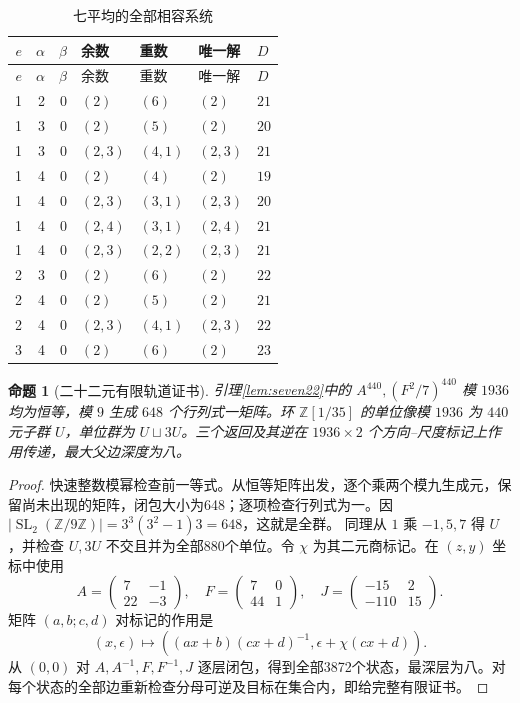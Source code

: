 \documentclass[11pt,a4paper]{article}
\newcommand{\Z}{\mathbb Z}
\newcommand{\SL}{\operatorname{SL}}
\newtheorem{proposition}[theorem]{命题}
\theoremstyle{definition}
\numberwithin{equation}{section}
\begin{document}
\begin{longtable}{rrrllll}
\caption{七平均的全部相容系统}\label{tab:seven-data}\\
\toprule $e$&$\alpha$&$\beta$&余数&重数&唯一解&$D$\\\midrule\endfirsthead
\toprule $e$&$\alpha$&$\beta$&余数&重数&唯一解&$D$\\\midrule\endhead
1&2&0&$(2)$&$(6)$&$(2)$&$21$\\
1&3&0&$(2)$&$(5)$&$(2)$&$20$\\
1&3&0&$(2,3)$&$(4,1)$&$(2,3)$&$21$\\
1&4&0&$(2)$&$(4)$&$(2)$&$19$\\
1&4&0&$(2,3)$&$(3,1)$&$(2,3)$&$20$\\
1&4&0&$(2,4)$&$(3,1)$&$(2,4)$&$21$\\
1&4&0&$(2,3)$&$(2,2)$&$(2,3)$&$21$\\
2&3&0&$(2)$&$(6)$&$(2)$&$22$\\
2&4&0&$(2)$&$(5)$&$(2)$&$21$\\
2&4&0&$(2,3)$&$(4,1)$&$(2,3)$&$22$\\
3&4&0&$(2)$&$(6)$&$(2)$&$23$\\
\bottomrule\end{longtable}\endgroup

\begin{proposition}[二十二元有限轨道证书]\label{prop:seven-certificate}
引理\ref{lem:seven22}中的 $A^{440},(F^2/7)^{440}$ 模 $1936$ 均为恒等，模 $9$ 生成 $648$ 个行列式一矩阵。环 $\Z[1/35]$ 的单位像模 $1936$ 为 $440$ 元子群 $U$，单位群为 $U\sqcup3U$。三个返回及其逆在 $1936\times2$ 个方向--尺度标记上作用传递，最大父边深度为八。
\end{proposition}
\begin{proof}
快速整数模幂检查前一等式。从恒等矩阵出发，逐个乘两个模九生成元，保留尚未出现的矩阵，闭包大小为648；逐项检查行列式为一。因 $|\SL_2(\Z/9\Z)|=3^3(3^2-1)3=648$，这就是全群。
同理从 $1$ 乘 $-1,5,7$ 得 $U$，并检查 $U,3U$ 不交且并为全部880个单位。令 $\chi$ 为其二元商标记。在 $(z,y)$ 坐标中使用
\[
A=\begin{pmatrix}7&-1\\22&-3\end{pmatrix},\quad
F=\begin{pmatrix}7&0\\44&1\end{pmatrix},\quad
J=\begin{pmatrix}-15&2\\-110&15\end{pmatrix}.
\]
矩阵 $(a,b;c,d)$ 对标记的作用是
\[
(x,\epsilon)\longmapsto((ax+b)(cx+d)^{-1},\epsilon+\chi(cx+d)).
\]
从 $(0,0)$ 对 $A,A^{-1},F,F^{-1},J$ 逐层闭包，得到全部3872个状态，最深层为八。对每个状态的全部边重新检查分母可逆及目标在集合内，即给完整有限证书。
\end{proof}
\end{document}
